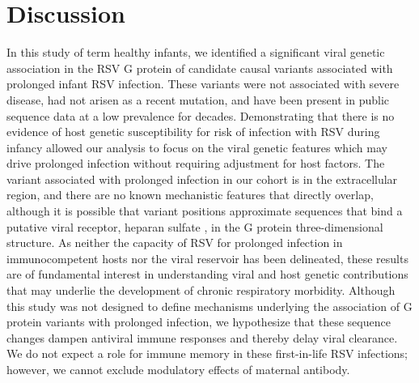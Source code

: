 \documentclass{article} %
\begin{document}



\section{Discussion}
In this study of term healthy infants, we identified a significant viral genetic association in the RSV G protein of candidate causal variants associated with prolonged infant RSV infection. These variants were not associated with severe disease, had not arisen as a recent mutation, and have been present in public sequence data at a low prevalence for decades. Demonstrating that there is no evidence of host genetic susceptibility for risk of infection with RSV during infancy allowed our analysis to focus on the viral genetic features which may drive prolonged infection without requiring adjustment for host factors. The variant associated with prolonged infection in our cohort is in the extracellular region, and there are no known mechanistic features that directly overlap, although it is possible that variant positions approximate sequences that bind a putative viral receptor, heparan sulfate \citep{feldman1999identification}, in the G protein three-dimensional structure.  As neither the capacity of RSV for prolonged infection in immunocompetent hosts nor the viral reservoir has been delineated,  these results are of fundamental interest in understanding viral and host genetic contributions that may underlie the development of chronic respiratory morbidity.
Although this study was not designed to define mechanisms underlying the association of G protein variants with prolonged infection, we hypothesize that these sequence changes dampen antiviral immune responses and thereby delay viral clearance. We do not expect a role for immune memory in these first-in-life RSV infections; however, we cannot exclude modulatory effects of maternal antibody. 
\end{document}
